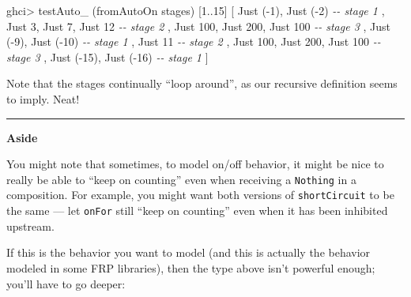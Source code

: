 \documentclass[]{article}
\newenvironment{Shaded}{}{}
\newcommand{\CommentTok}[1]{\textcolor[rgb]{0.38,0.63,0.69}{\textit{#1}}}
\newcommand{\DataTypeTok}[1]{\textcolor[rgb]{0.56,0.13,0.00}{#1}}
\newcommand{\DecValTok}[1]{\textcolor[rgb]{0.25,0.63,0.44}{#1}}
\newcommand{\NormalTok}[1]{#1}
\newcommand{\OperatorTok}[1]{\textcolor[rgb]{0.40,0.40,0.40}{#1}}
\begin{document}
\begin{Shaded}
\begin{Highlighting}[]
\NormalTok{ghci}\OperatorTok{>}\NormalTok{ testAuto\_ (fromAutoOn stages) [}\DecValTok{1}\OperatorTok{..}\DecValTok{15}\NormalTok{]}
\NormalTok{[ }\DataTypeTok{Just}\NormalTok{ (}\OperatorTok{{-}}\DecValTok{1}\NormalTok{), }\DataTypeTok{Just}\NormalTok{ (}\OperatorTok{{-}}\DecValTok{2}\NormalTok{)              }\CommentTok{{-}{-} stage 1}
\NormalTok{, }\DataTypeTok{Just} \DecValTok{3}\NormalTok{, }\DataTypeTok{Just} \DecValTok{7}\NormalTok{, }\DataTypeTok{Just} \DecValTok{12}           \CommentTok{{-}{-} stage 2}
\NormalTok{, }\DataTypeTok{Just} \DecValTok{100}\NormalTok{, }\DataTypeTok{Just} \DecValTok{200}\NormalTok{, }\DataTypeTok{Just} \DecValTok{100}      \CommentTok{{-}{-} stage 3}
\NormalTok{, }\DataTypeTok{Just}\NormalTok{ (}\OperatorTok{{-}}\DecValTok{9}\NormalTok{), }\DataTypeTok{Just}\NormalTok{ (}\OperatorTok{{-}}\DecValTok{10}\NormalTok{)             }\CommentTok{{-}{-} stage 1}
\NormalTok{, }\DataTypeTok{Just} \DecValTok{11}                           \CommentTok{{-}{-} stage 2}
\NormalTok{, }\DataTypeTok{Just} \DecValTok{100}\NormalTok{, }\DataTypeTok{Just} \DecValTok{200}\NormalTok{, }\DataTypeTok{Just} \DecValTok{100}      \CommentTok{{-}{-} stage 3}
\NormalTok{, }\DataTypeTok{Just}\NormalTok{ (}\OperatorTok{{-}}\DecValTok{15}\NormalTok{), }\DataTypeTok{Just}\NormalTok{ (}\OperatorTok{{-}}\DecValTok{16}\NormalTok{)            }\CommentTok{{-}{-} stage 1}
\NormalTok{]}
\end{Highlighting}
\end{Shaded}

Note that the stages continually ``loop around'', as our recursive definition
seems to imply. Neat!

\begin{center}\rule{0.5\linewidth}{\linethickness}\end{center}

\textbf{Aside}

You might note that sometimes, to model on/off behavior, it might be nice to
really be able to ``keep on counting'' even when receiving a \texttt{Nothing} in
a composition. For example, you might want both versions of
\texttt{shortCircuit} to be the same --- let \texttt{onFor} still ``keep on
counting'' even when it has been inhibited upstream.

If this is the behavior you want to model (and this is actually the behavior
modeled in some FRP libraries), then the type above isn't powerful enough;
you'll have to go deeper:
\end{document}
